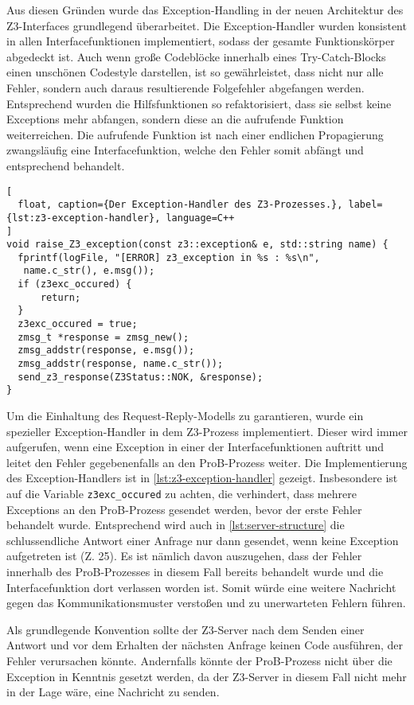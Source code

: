 Aus diesen Gründen wurde das Exception-Handling in der neuen Architektur des Z3-Interfaces grundlegend überarbeitet.
Die Exception-Handler wurden konsistent in allen Interfacefunktionen implementiert, sodass der gesamte Funktionskörper abgedeckt ist.
Auch wenn große Codeblöcke innerhalb eines Try-Catch-Blocks einen unschönen Codestyle darstellen,
ist so gewährleistet, dass nicht nur alle Fehler, sondern auch daraus resultierende Folgefehler abgefangen werden.
Entsprechend wurden die Hilfsfunktionen so refaktorisiert, dass sie selbst keine Exceptions mehr abfangen, sondern diese an die aufrufende Funktion weiterreichen.
Die aufrufende Funktion ist nach einer endlichen Propagierung zwangsläufig eine Interfacefunktion, welche den Fehler somit abfängt und entsprechend behandelt.

\begin{lstlisting}[
  float, caption={Der Exception-Handler des Z3-Prozesses.}, label={lst:z3-exception-handler}, language=C++
]
void raise_Z3_exception(const z3::exception& e, std::string name) {
  fprintf(logFile, "[ERROR] z3_exception in %s : %s\n",
   name.c_str(), e.msg());
  if (z3exc_occured) {
      return;
  }
  z3exc_occured = true;
  zmsg_t *response = zmsg_new();
  zmsg_addstr(response, e.msg());
  zmsg_addstr(response, name.c_str());
  send_z3_response(Z3Status::NOK, &response);
}
\end{lstlisting}

Um die Einhaltung des Request-Reply-Modells zu garantieren, wurde ein spezieller Exception-Handler in dem Z3-Prozess implementiert.
Dieser wird immer aufgerufen, wenn eine Exception in einer der Interfacefunktionen auftritt und leitet den Fehler gegebenenfalls an den ProB-Prozess weiter.
Die Implementierung des Exception-Handlers ist in \cref{lst:z3-exception-handler} gezeigt.
Insbesondere ist auf die Variable \texttt{z3exc\_occured} zu achten, die verhindert, dass mehrere Exceptions an den ProB-Prozess gesendet werden, bevor der erste Fehler behandelt wurde.
Entsprechend wird auch in \cref{lst:server-structure} die schlussendliche Antwort einer Anfrage nur dann gesendet, wenn keine Exception aufgetreten ist (Z. 25).
Es ist nämlich davon auszugehen, dass der Fehler innerhalb des ProB-Prozesses in diesem Fall bereits behandelt wurde und die Interfacefunktion dort verlassen worden ist.
Somit würde eine weitere Nachricht gegen das Kommunikationsmuster verstoßen und zu unerwarteten Fehlern führen.

Als grundlegende Konvention sollte der Z3-Server nach dem Senden einer Antwort und vor dem Erhalten der nächsten Anfrage keinen Code ausführen, der Fehler verursachen könnte.
Andernfalls könnte der ProB-Prozess nicht über die Exception in Kenntnis gesetzt werden, da der Z3-Server in diesem Fall nicht mehr in der Lage wäre, eine Nachricht zu senden.

